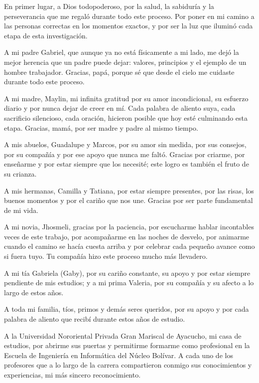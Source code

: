 \documentclass[12pt, letterpaper]{report}
\begin{document}
{
En primer lugar, a Dios todopoderoso, por la salud, la sabiduría y la perseverancia que me regaló durante todo este proceso. Por poner en mi camino a las personas correctas en los momentos exactos, y por ser la luz que iluminó cada etapa de esta investigación.

A mi padre Gabriel, que aunque ya no está físicamente a mi lado, me dejó la mejor herencia que un padre puede dejar: valores, principios y el ejemplo de un hombre trabajador. Gracias, papá, porque sé que desde el cielo me cuidaste durante todo este proceso.

A mi madre, Maylin, mi infinita gratitud por su amor incondicional, su esfuerzo diario y por nunca dejar de creer en mí. Cada palabra de aliento suya, cada sacrificio silencioso, cada oración, hicieron posible que hoy esté culminando esta etapa. Gracias, mamá, por ser madre y padre al mismo tiempo.

A mis abuelos, Guadalupe y Marcos, por su amor sin medida, por sus consejos, por su compañía y por ese apoyo que nunca me faltó. Gracias por criarme, por enseñarme y por estar siempre que los necesité; este logro es también el fruto de su crianza.

A mis hermanas, Camilla y Tatiana, por estar siempre presentes, por las risas, los buenos momentos y por el cariño que nos une. Gracias por ser parte fundamental de mi vida.

A mi novia, Jhosmeli, gracias por la paciencia, por escucharme hablar incontables veces de este trabajo, por acompañarme en las noches de desvelo, por animarme cuando el camino se hacía cuesta arriba y por celebrar cada pequeño avance como si fuera tuyo. Tu compañía hizo este proceso mucho más llevadero.

A mi tía Gabriela (Gaby), por su cariño constante, su apoyo y por estar siempre pendiente de mis estudios; y a mi prima Valeria, por su compañía y su afecto a lo largo de estos años.

A toda mi familia, tíos, primos y demás seres queridos, por su apoyo y por cada palabra de aliento que recibí durante estos años de estudio.

A la Universidad Nororiental Privada Gran Mariscal de Ayacucho, mi casa de estudios, por abrirme sus puertas y permitirme formarme como profesional en la Escuela de Ingeniería en Informática del Núcleo Bolívar. A cada uno de los profesores que a lo largo de la carrera compartieron conmigo sus conocimientos y experiencias, mi más sincero reconocimiento.

}
\end{document}
